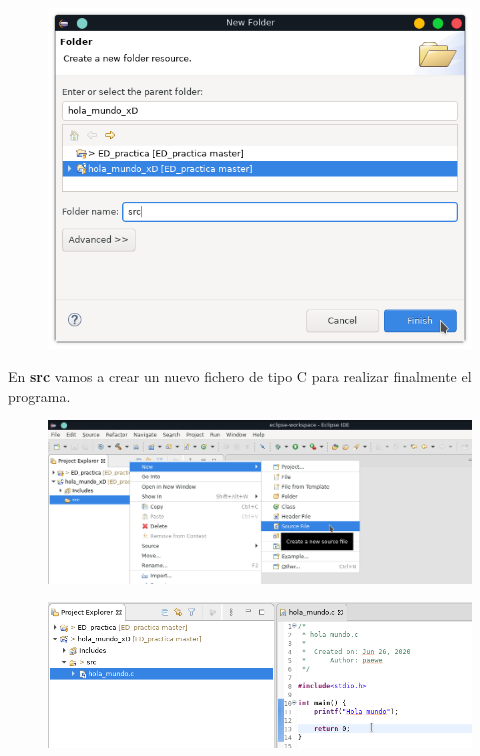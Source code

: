 \documentclass{article}
\begin{document}
\newpage

\begin{figure}[h!]
  \centering
  \includegraphics[scale=0.75]{./Pictures/025_src.png}
\end{figure}

En \textbf{src} vamos a crear un nuevo fichero de tipo C para realizar
finalmente el programa.

\begin{figure}[h!]
  \centering
  \includegraphics[scale=0.65]{./Pictures/026_new_c_file.png}
\end{figure}

\begin{figure}[h!]
  \centering
  \includegraphics[scale=0.75]{./Pictures/027_hola_mundo.png}
\end{figure}
\end{document}
